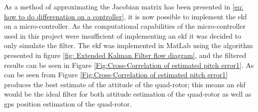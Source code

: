 As a method of approximating the Jacobian matrix has been presented in \eqref{eq: how to do differenation on a controller}, it is now possible to implement the \gls{ekf} on a micro-controller. As the computational capabilities of the micro-controller used in this project were insufficient of implementing an \gls{ekf} it was decided to only simulate the filter. The \gls{ekf} was implemented in MatLab using the algorithm presented in figure \ref{fig: Extended Kalman Filter flow diagram}, and the filtered results can be seen in Figure \ref{Fig:Cross-Correlation of estimated pitch error1}. As can be seen from Figure \ref{Fig:Cross-Correlation of estimated pitch error1} produces the best estimate of the attitude of the quad-rotor; this means an \gls{ekf} would be the ideal filter for both attitude estimation of the quad-rotor as well as \gls{gps} position estimation of the quad-rotor. 


